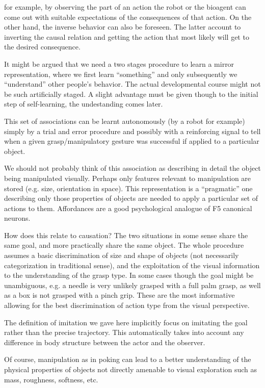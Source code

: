 for example, by observing the part of an action the robot or the
bioagent can come out with suitable expectations of the consequences
of that action. On the other hand, the inverse behavior can also be
foreseen. The latter account to inverting the causal relation and
getting the action that most likely will get to the desired
consequence.

It might be argued that we need a two stages procedure to learn a
mirror representation, where we first learn ``something'' and only
subsequently we ``understand'' other people's behavior. The actual
developmental course might not be such artificially staged. A slight
advantage must be given though to the initial step of self-learning,
the undestanding comes later.


This set of associations can be learnt autonomously (by a robot for
example) simply by a trial and error procedure and possibly with a
reinforcing signal to tell when a given grasp/manipulatory gesture was
successful if applied to a particular object.

We should not probably think of this association as describing in
detail the object being manipulated visually. Perhaps only features
relevant to manipulation are stored (e.g. size, orientation in space).
This representation is a ``pragmatic'' one describing only those
properties of objects are needed to apply a particular set of actions
to them. Affordances are a good psychological analogue of F5
canonical neurons.
\fi


\ifverbose
How does this relate to causation?  The two situations in some sense
share the same goal, and more practically share the same object.  The
whole procedure assumes a basic discrimination of size and shape of
objects (not necessarily categorization in traditional sense), and the
exploitation of the visual information to the understanding of the
grasp type. In some cases though the goal might be unambiguous, e.g. a
needle is very unlikely grasped with a full palm grasp, as well as a
box is not grasped with a pinch grip. These are the most informative
allowing for the best discrimination of action type from the visual
perspective.
\fi

\ifverbose
The definition of imitation we gave here implicitly focus on imitating
the goal rather than the precise trajectory. This automatically takes
into account any difference in body structure between the actor and
the observer.

Of course, manipulation as in poking can lead to a better
understanding of the physical properties of objects not directly
amenable to visual exploration such as mass, roughness, softness, etc.
\fi

